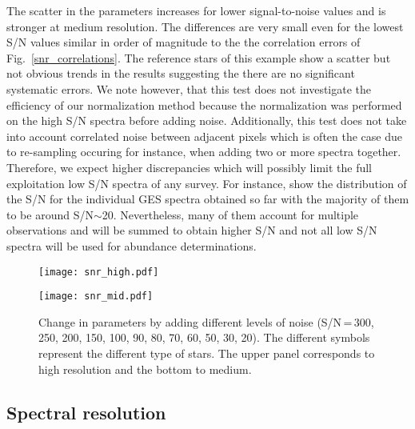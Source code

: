 \documentclass[fleqn,usenatbib]{mnras}
\begin{document}
The scatter in the parameters increases for lower signal-to-noise values and is stronger at medium resolution. The differences are very small even for the lowest S/N values similar in order of 
magnitude to the the correlation errors of Fig.~\ref{snr_correlations}. The reference stars of this example show a scatter but not obvious trends in the results suggesting the there are no 
significant systematic errors. 
We note however, that this test does not investigate the efficiency of our normalization method because the normalization was performed on the high 
S/N spectra before adding noise. Additionally, this test does not take into account correlated noise between adjacent pixels which is often the case due to re-sampling occuring for instance, 
when adding two or more spectra together. Therefore, we expect higher discrepancies which will possibly limit the full exploitation 
low S/N spectra of any survey. For instance, \cite{Pancino2017} show the distribution of the S/N for the individual GES spectra obtained so far with the majority of them to be 
around S/N$\sim$20. Nevertheless, many of them account for multiple observations and will be summed to obtain higher S/N and not all low S/N spectra will be used for abundance determinations. 
 

\begin{figure*}
 \centering
 \begin{minipage}{0.5\textwidth}
   \texttt{[image: snr\_high.pdf]}
 \end{minipage}
\hspace{-0.01\textwidth}%
 \begin{minipage}{0.5\textwidth}
   \texttt{[image: snr\_mid.pdf]} 
 \end{minipage}
  \caption{Change in parameters by adding different levels of noise (S/N\,=\,300, 250, 200, 150, 100, 90, 80, 70, 60, 50, 30, 20). The different symbols represent the different 
  type of stars. The upper panel corresponds to high resolution and the bottom to medium.}
  \label{fig_snr}
  \end{figure*}

\subsection{Spectral resolution}
\end{document}
